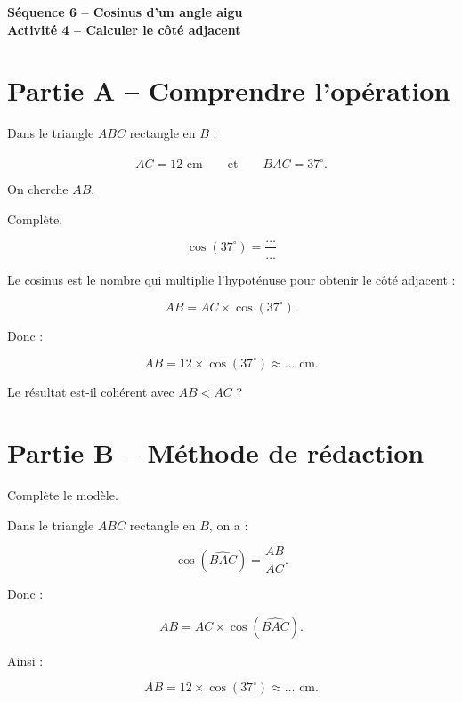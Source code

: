 \documentclass[12pt,a4paper]{article}
\newcommand{\titreseq}[1]{%
\begin{center}
{\sffamily\LARGE\bfseries\color{TitreC}Séquence 6 -- Cosinus d'un angle aigu}\\[0.2em]
{\sffamily\large\bfseries\color{SavoirC}#1}
\end{center}}
\begin{document}
\titreseq{Activité 4 -- Calculer le côté adjacent}

\section*{Partie A -- Comprendre l'opération}

Dans le triangle \(ABC\) rectangle en \(B\) :

\[
AC=12\text{ cm}
\qquad\text{et}\qquad
\widehat{BAC}=37^\circ.
\]

On cherche \(AB\).

\begin{center}
\end{center}

Complète.

\[
\cos(37^\circ)=\frac{\ldots}{\ldots}
\]

Le cosinus est le nombre qui multiplie l'hypoténuse pour obtenir le côté adjacent :

\[
AB=AC\times\cos(37^\circ).
\]

Donc :

\[
AB=12\times\cos(37^\circ)\approx\ldots\text{ cm}.
\]

Le résultat est-il cohérent avec \(AB<AC\) ?

\section*{Partie B -- Méthode de rédaction}

Complète le modèle.

\begin{tcolorbox}[colback=white,colframe=SavoirC,boxrule=0.7pt,arc=2mm]
Dans le triangle \(ABC\) rectangle en \(B\), on a :

\[
\cos(\widehat{BAC})=\frac{AB}{AC}.
\]

Donc :

\[
AB=AC\times\cos(\widehat{BAC}).
\]

Ainsi :

\[
AB=12\times\cos(37^\circ)
\approx\ldots\text{ cm}.
\]
\end{tcolorbox}
\end{document}
